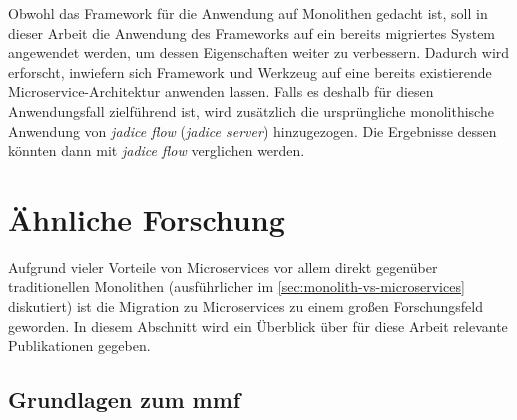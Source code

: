 Obwohl das Framework für die Anwendung auf Monolithen gedacht ist, soll in dieser Arbeit die Anwendung des Frameworks auf ein bereits migriertes System angewendet werden, um dessen Eigenschaften weiter zu verbessern.
Dadurch wird erforscht, inwiefern sich Framework und Werkzeug auf eine bereits existierende Microservice-Architektur anwenden lassen.
Falls es deshalb für diesen Anwendungsfall zielführend ist, wird zusätzlich die ursprüngliche monolithische Anwendung von \emph{jadice flow} (\emph{jadice server}) hinzugezogen.
Die Ergebnisse dessen könnten dann mit \emph{jadice flow} verglichen werden.

\section{Ähnliche Forschung}

Aufgrund vieler Vorteile von Microservices vor allem direkt gegenüber traditionellen Monolithen (ausführlicher im \cref{sec:monolith-vs-microservices} diskutiert) ist die Migration zu Microservices zu einem großen Forschungsfeld geworden.
In diesem Abschnitt wird ein Überblick über für diese Arbeit relevante Publikationen gegeben.

\subsection{Grundlagen zum \gls{mmf}}

